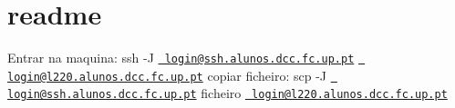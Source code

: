 \chapter{readme}
\hypertarget{md_readme}{}\label{md_readme}
Entrar na maquina\+: ssh -\/J \href{mailto:login@ssh.alunos.dcc.fc.up.pt}{\texttt{ login@ssh.\+alunos.\+dcc.\+fc.\+up.\+pt}} \href{mailto:login@l220.alunos.dcc.fc.up.pt}{\texttt{ login@l220.\+alunos.\+dcc.\+fc.\+up.\+pt}} copiar ficheiro\+: scp -\/J \href{mailto:login@ssh.alunos.dcc.fc.up.pt}{\texttt{ login@ssh.\+alunos.\+dcc.\+fc.\+up.\+pt}} ficheiro \href{mailto:login@l220.alunos.dcc.fc.up.pt}{\texttt{ login@l220.\+alunos.\+dcc.\+fc.\+up.\+pt}} 